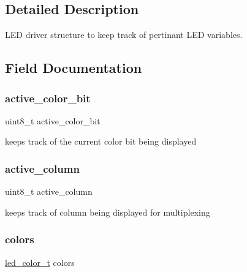 \subsection{Detailed Description}
L\+ED driver structure to keep track of pertinant L\+ED variables. 

\subsection{Field Documentation}
\hypertarget{struct_l_e_d__drvr__t_a36030c0b3d311ba697fb3e70ad7680a2}{}\label{struct_l_e_d__drvr__t_a36030c0b3d311ba697fb3e70ad7680a2} 
\subsubsection{\texorpdfstring{active\+\_\+color\+\_\+bit}{active\_color\_bit}}
{\footnotesize\ttfamily uint8\+\_\+t active\+\_\+color\+\_\+bit}



keeps track of the current color bit being displayed 

\hypertarget{struct_l_e_d__drvr__t_a736bd2bd907652812bf3a1f3d20eb9ae}{}\label{struct_l_e_d__drvr__t_a736bd2bd907652812bf3a1f3d20eb9ae} 
\subsubsection{\texorpdfstring{active\+\_\+column}{active\_column}}
{\footnotesize\ttfamily uint8\+\_\+t active\+\_\+column}



keeps track of column being displayed for multiplexing 

\hypertarget{struct_l_e_d__drvr__t_a544f37552e92b00030921908e34edda4}{}\label{struct_l_e_d__drvr__t_a544f37552e92b00030921908e34edda4} 
\subsubsection{\texorpdfstring{colors}{colors}}
{\footnotesize\ttfamily \hyperlink{structled__color__t}{led\+\_\+color\+\_\+t} colors}



